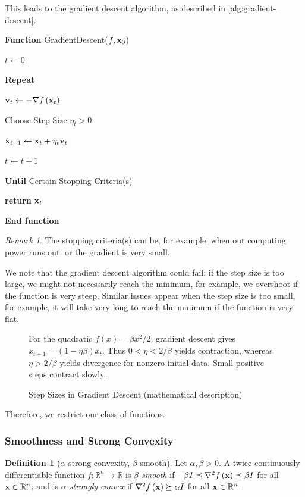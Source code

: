 \documentclass[11pt]{article}
\theoremstyle{definition}
\newtheorem{definition}[theorem]{Definition}
\theoremstyle{remark}
\newtheorem{remark}[theorem]{Remark}
\newcommand{\pqty}[1]{\left(#1\right)}
\newcommand{\functiondomain}[3]{#1:#2\to #3}
\newcommand{\RR}{\mathbb{R}}
\newcommand{\grad}{\nabla}
\newcommand{\identityM}{I}
\newcommand{\posDefEq}{\succeq}
\newcommand{\negDefEq}{\preceq}
\newenvironment{algorithmic}{\begin{list}{}{\setlength{\leftmargin}{1em}\setlength{\itemsep}{2pt}}}{\end{list}}
\newcommand{\State}{\item[]}
\newcommand{\Function}[2]{\item[]\textbf{Function }#1(#2)}
\newcommand{\EndFunction}{\item[]\textbf{End function}}
\newcommand{\Return}{\textbf{return } }
\newcommand{\Repeat}{\item[]\textbf{Repeat}}
\newcommand{\Until}[1]{\item[]\textbf{Until }#1}
\begin{document}
This leads to the gradient descent algorithm, as described in \autoref{alg:gradient-descent}.

\begin{algorithm}[ht!]
    \caption{Gradient Descent Algorithm}\label{alg:gradient-descent}%
    \begin{algorithmic}
        \Function{GradientDescent}{\(f, \vb{x}_0\)}
        \State \(t \gets 0\)
        \Repeat
            \State \(\vb{v}_t \gets - \grad f\pqty{\vb{x}_t}\)
            \State Choose Step Size \(\eta_t > 0\)
            \State \(\vb{x}_{t + 1} \gets \vb{x}_t + \eta_t \vb{v}_t\)
            \State \(t \gets t + 1\)
        \Until{Certain Stopping Criteria(s)}
        \State \Return{\(\vb{x}_{t}\)}
        \EndFunction
    \end{algorithmic}
\end{algorithm}

\begin{remark}\label{optim-unit-0010}
    The stopping criteria(s) can be, for example, when out computing power runs out, or the gradient is very small.
\end{remark}

We note that the gradient descent algorithm could fail: if the step size is too large, we might not necessarily reach the minimum, for example, we overshoot if the function is very steep. Similar issues appear when the step size is too small, for example, it will take very long to reach the minimum if the function is very flat. 

\begin{figure}[ht!]\centering\begin{minipage}{0.94\linewidth}For the quadratic \(f(x)=\beta x^2/2\), gradient descent gives \(x_{t+1}=(1-\eta\beta)x_t\). Thus \(0<\eta<2/\beta\) yields contraction, whereas \(\eta>2/\beta\) yields divergence for nonzero initial data. Small positive steps contract slowly.\end{minipage}\caption{Step Sizes in Gradient Descent (mathematical description)}\label{fig:gradient-descent-step-sizes}\end{figure}

Therefore, we restrict our class of functions.

\subsubsection{Smoothness and Strong Convexity}

\begin{definition}[\(\alpha\)-strong convexity, \(\beta\)-smooth]\label{optim-unit-0011}
    \label{def:alpha-sc-beta-smooth}%
    Let \(\alpha, \beta > 0\). A twice continuously differentiable function \(\functiondomain{f}{\RR^n}{\RR}\) is \emph{\(\beta\)-smooth} if \(-\beta\identityM\preceq\grad^2 f\pqty{\vb{x}} \negDefEq \beta \identityM\) for all \(\vb{x} \in \RR^n\); and is \emph{\(\alpha\)-strongly convex} if \(\grad^2 f\pqty{\vb{x}} \posDefEq \alpha \identityM\) for all \(\vb{x} \in \RR^n\).
\end{definition}
\end{document}
